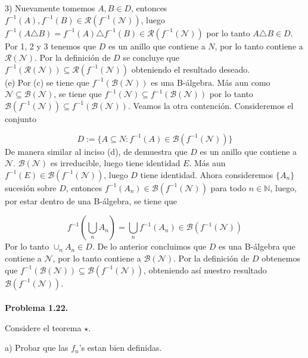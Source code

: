 \documentclass[12pt]{article}
\begin{document}
    3) Nuevamente tomemos $A,B\in D$, entonces $f^{-1}(A), f^{-1}(B)\in \mathscr{R}(f^{-1}(\mathcal{N}))$,
    luego \hspace*{30pt} $f^{-1}(A\triangle B) = f^{-1}(A)\triangle f^{-1}(B)\in \mathscr{R}(f^{-1}(\mathcal{N}))$ por
    lo tanto $A\triangle B\in D$.
    \\

    \noindent Por 1, 2 y 3 tenemos que $D$ es un anillo que contiene a $N$, por lo tanto contiene a 
    $\mathscr{R}(\mathcal{N})$. Por la definici\'on de $D$ se concluye que 
    $f^{-1}(\mathscr{R}(\mathcal{N})) \subseteq \mathscr{R}(f^{-1}(\mathcal{N}))$ obteniendo
    el resultado deseado.
    \\

    (e) Por (c) se tiene que $f^{-1}(\mathscr{B}(\mathcal{N}))$ es una B-\'algebra. M\'as aun
    como $\mathcal{N}\subseteq \mathscr{B}(\mathcal{N})$, se tiene que
    $f^{-1}(\mathcal{N})\subseteq f^{-1}(\mathscr{B}(\mathcal{N}))$ por lo tanto 
    $\mathscr{B}(f^{-1}(\mathcal{N})) \subseteq f^{-1}(\mathscr{B}(\mathcal{N}))$. Veamos la 
    otra contenci\'on. Consideremos el conjunto

    \[D := \{A \subseteq N : f^{-1}(A)\in \mathscr{B}(f^{-1}(\mathcal{N}))\}\]
    De manera similar al inciso (d), de demuestra que $D$ es un anillo que contiene a $\mathcal{N}$. 
    $\mathscr{B}(\mathcal{N})$ es irreducible, luego tiene identidad $E$. M\'as aun 
    $f^{-1}(E)\in \mathscr{B}(f^{-1}(\mathcal{N}))$, luego $D$ tiene identidad. Ahora 
    consideremos $\{A_n\}$ sucesi\'on sobre $D$, entonces 
    $f^{-1}(A_n)\in \mathscr{B}(f^{-1}(\mathcal{N}))$ para todo $n\in \mathbb{N}$, luego,
    por estar dentro de una B-\'algebra, se tiene que 

    \[f^{-1}\left(\bigcup_n A_n\right) = \bigcup_n f^{-1} (A_n) \in \mathscr{B}(f^{-1}(\mathcal{N}))\]
    Por lo tanto $\cup_n A_n \in D$. De lo anterior concluimos que $D$ es una B-\'algebra que 
    contiene a $\mathcal{N}$, por lo tanto contiene a $\mathscr{B}(\mathcal{N})$. Por la 
    definici\'on de $D$ obtenemos que 
    $f^{-1}(\mathscr{B}(\mathcal{N}))\subseteq \mathscr{B}(f^{-1}(\mathcal{N}))$, obteniendo 
    as\'i nuestro resultado $\mathscr{B}(f^{-1}(\mathcal{N}))$.
    \\ \\ 

    \textbf{Problema 1.22.}

    Considere el teorema $\star$.

    a) Probar que las $f_n$'s estan bien definidas.
\end{document}
